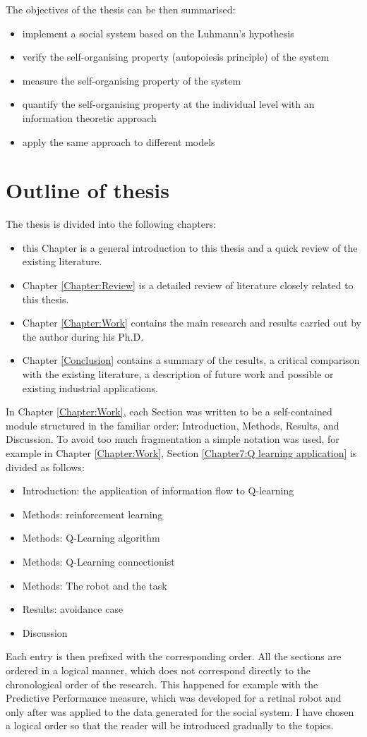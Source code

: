 The objectives of the thesis can be then summarised:
\begin{itemize}
\item implement a social system based on the Luhmann's hypothesis
\item verify the self-organising property (autopoiesis principle) of the system
\item measure the self-organising property of the system
\item quantify the self-organising property at the individual level with an
information theoretic approach
\item apply the same approach to different models
\end{itemize}

\section{Outline of thesis}
The thesis is divided into the following chapters:
\begin{itemize}
 \item this Chapter is a general introduction to this thesis
and a quick review of the existing literature.
 \item Chapter \ref{Chapter:Review} is a detailed review of literature closely related to this thesis.
 \item Chapter \ref{Chapter:Work} contains the main research and results
carried out by the author during his Ph.D.
 \item Chapter \ref{Conclusion} contains a summary of the results, a critical
comparison with the existing literature, a description of future work
and possible or existing industrial applications.
\end{itemize}

In Chapter \ref{Chapter:Work}, each Section was written to be a self-contained
module structured in the familiar order: Introduction, Methods, Results, and Discussion.
To avoid too much fragmentation a simple notation was used, for example in 
Chapter \ref{Chapter:Work}, Section \ref{Chapter7:Q learning application} 
is divided as follows:
\begin{itemize}
 \item Introduction: the application of information flow to Q-learning
 \item Methods: reinforcement learning
 \item Methods: Q-Learning algorithm
 \item Methods: Q-Learning connectionist
 \item Methods: The robot and the task
 \item Results: avoidance case
 \item Discussion
\end{itemize}
Each entry is then prefixed with the corresponding order.
All the sections are ordered in a logical manner, which does not correspond directly
to the chronological order of the research.
This happened for example with the Predictive Performance measure, which was
developed for a retinal robot and only after was applied to the data generated for
 the social system.
I have chosen a logical order so that the reader will be introduced gradually
to the topics.


